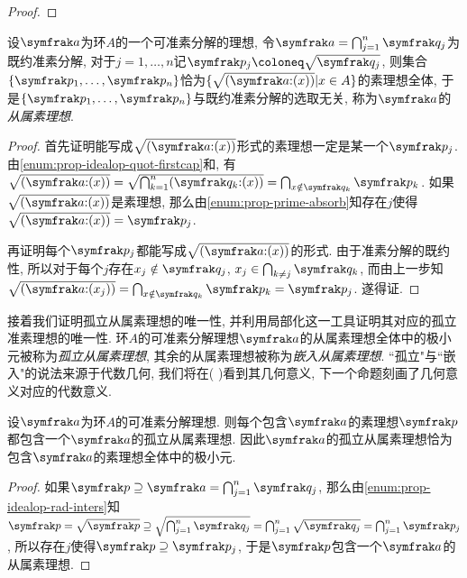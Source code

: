 \begin{proof}
\end{proof}

\begin{theorem}\label{prop:primuniq1}
  设$\ideal{a}$为环$A$的一个可准素分解的理想, 令$\ideal{a}=\bigcap_{j=1}^n \ideal{q}_j$为既约准素分解, 对于$j=1, \dotsc, n$记$\ideal{p}_j\coloneq \sqrt{\ideal{q}_j}$, 则集合$\{\ideal{p}_1, \dotsc, \ideal{p}_n\}$恰为$\{\sqrt{(\ideal{a}{:}(x))}\vert x\in A\}$的素理想全体, 于是$\{\ideal{p}_1, \dotsc, \ideal{p}_n\}$与既约准素分解的选取无关, 称为$\ideal{a}$的\emph{从属素理想}.
\end{theorem}

\begin{proof}
  首先证明能写成$\sqrt{(\ideal{a}{:}(x))}$形式的素理想一定是某一个$\ideal{p}_j$. 由\ref{enum:prop-idealop-quot-firstcap}和, 有$\sqrt{(\ideal{a}{:}(x))}=\sqrt{\bigcap_{k=1}^n(\ideal{q}_k{:}(x))}=\bigcap_{x\notin\ideal{q}_k}\ideal{p}_k$. 如果$\sqrt{(\ideal{a}{:}(x))}$是素理想, 那么由\ref{enum:prop-prime-absorb}知存在$j$使得$\sqrt{(\ideal{a}{:}(x))}=\ideal{p}_j$.

  再证明每个$\ideal{p}_j$都能写成$\sqrt{(\ideal{a}{:}(x))}$的形式. 由于准素分解的既约性, 所以对于每个$j$存在$x_j\notin\ideal{q}_j$, $x_j\in\bigcap_{k\neq j}\ideal{q}_k$, 而由上一步知$\sqrt{(\ideal{a}{:}(x_j))}=\bigcap_{x\notin\ideal{q}_k}\ideal{p}_k=\ideal{p}_j$. 遂得证.
\end{proof}

接着我们证明孤立从属素理想的唯一性, 并利用局部化这一工具证明其对应的孤立准素理想的唯一性. 环$A$的可准素分解理想$\ideal{a}$的从属素理想全体中的极小元被称为\emph{孤立从属素理想}, 其余的从属素理想被称为\emph{嵌入从属素理想}. ``孤立"与``嵌入"的说法来源于代数几何, 我们将在(%
)看到其几何意义, 下一个命题刻画了几何意义对应的代数意义.

\begin{proposition}
  设$\ideal{a}$为环$A$的可准素分解理想. 则每个包含$\ideal{a}$的素理想$\ideal{p}$都包含一个$\ideal{a}$的孤立从属素理想. 因此$\ideal{a}$的孤立从属素理想恰为包含$\ideal{a}$的素理想全体中的极小元.
\end{proposition}

\begin{proof}
  如果$\ideal{p}\supseteq\ideal{a}=\bigcap_{j=1}^n\ideal{q}_j$, 那么由\ref{enum:prop-idealop-rad-inters}知$\ideal{p}=\sqrt{\ideal{p}}\supseteq\sqrt{\bigcap_{j=1}^n\ideal{q}_j}=\bigcap_{j=1}^n\sqrt{\ideal{q}_j}=\bigcap_{j=1}^n\ideal{p}_j$, 所以存在$j$使得$\ideal{p}\supseteq\ideal{p}_j$, 于是$\ideal{p}$包含一个$\ideal{a}$的从属素理想.
\end{proof}

